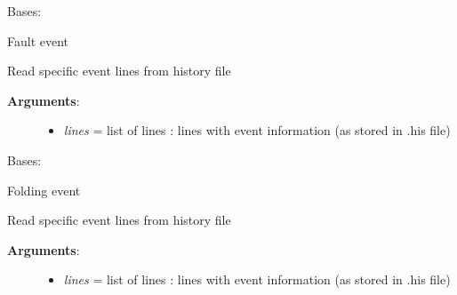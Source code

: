 \documentclass[a4paper,10pt,english]{sphinxmanual}
\begin{document}
\begin{fulllineitems}
\label{pynoddy:pynoddy.events.Fault}
Bases: {\hyperref[pynoddy:pynoddy.events.Event]{\emph{}}}

Fault event

\begin{fulllineitems}
\label{pynoddy:pynoddy.events.Fault.parse_event_lines}
Read specific event lines from history file
\begin{description}
\item[{\textbf{Arguments}:}] \leavevmode\begin{itemize}
\item {} 
\emph{lines} = list of lines : lines with event information (as stored in .his file)

\end{itemize}

\end{description}

\end{fulllineitems}


\end{fulllineitems}


\begin{fulllineitems}
\label{pynoddy:pynoddy.events.Fold}
Bases: {\hyperref[pynoddy:pynoddy.events.Event]{\emph{}}}

Folding event

\begin{fulllineitems}
\label{pynoddy:pynoddy.events.Fold.parse_event_lines}
Read specific event lines from history file
\begin{description}
\item[{\textbf{Arguments}:}] \leavevmode\begin{itemize}
\item {} 
\emph{lines} = list of lines : lines with event information (as stored in .his file)

\end{itemize}

\end{description}

\end{fulllineitems}


\end{fulllineitems}
\end{document}
